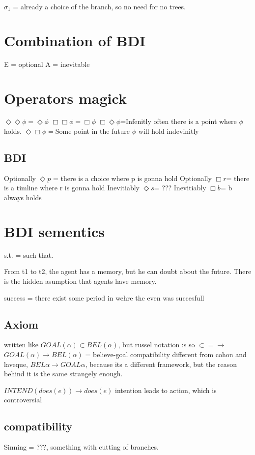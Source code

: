 \documentclass{article}
\begin{document}
$\sigma_1$ = already a choice of the branch, so no need for no trees.

\section{Combination of BDI}
E = optional
A = inevitable

\section{Operators magick}
$\Diamond\Diamond\phi=\Diamond\phi$
$\Box\Box\phi=\Box\phi$
$\Box\Diamond\phi$=Infenitly often there is a point where $\phi$ holds.
$\Diamond\Box\phi=$Some point in the future $\phi$ will hold indevinitly

\subsection{BDI}
Optionally $\Diamond p$ = there is a choice where p is gonna hold
Optionally $\Box r$= there is a timline where r is gonna hold
Inevitiably $\Diamond s$=  ???
Inevitiably $\Box b$=  b always holds

\section{BDI sementics}
s.t. = such that.

From t1 to t2, the agent has a memory, but he can doubt about the future.
There is the hidden asumption that agents have memory.

success = there exist some period in wehre the even was succesfull

\subsection{Axiom}
written like $GOAL(\alpha) \subset BEL(\alpha)$, but russel notation :s so
$\subset = \to$
$GOAL(\alpha) \to BEL(\alpha)$ = believe-goal compatibility
different from cohon and laveque, $BEL \alpha \to GOAL \alpha$, because
its a different framework, but the reason behind it is the same strangely
enough.

$INTEND(does(e))\to does(e)$ intention leads to action, which is controversial

\subsection{compatibility}
Sinning = ???, something with cutting of branches.
\end{document}
